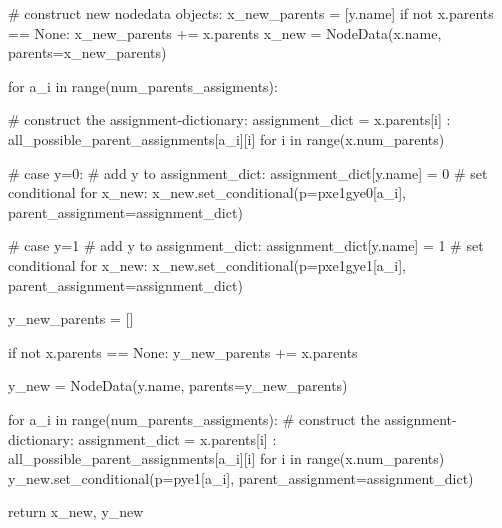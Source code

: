 \begin{python}
    # construct new nodedata objects:
    x_new_parents = [y.name]
    if not x.parents == None:
        x_new_parents += x.parents
    x_new = NodeData(x.name, parents=x_new_parents)

    for a_i in range(num_parents_assigments):
        
        # construct the assignment-dictionary:
        assignment_dict = {x.parents[i] : all_possible_parent_assignments[a_i][i] for i in range(x.num_parents)}

        # case y=0:
        # add y to assignment_dict:
        assignment_dict[y.name] = 0
        # set conditional for x_new:
        x_new.set_conditional(p=pxe1gye0[a_i], parent_assignment=assignment_dict)

        # case y=1
        # add y to assignment_dict:
        assignment_dict[y.name] = 1
        # set conditional for x_new:
        x_new.set_conditional(p=pxe1gye1[a_i], parent_assignment=assignment_dict)

    y_new_parents = []
    
    if not x.parents == None:
        y_new_parents += x.parents
        
    y_new = NodeData(y.name, parents=y_new_parents)
    
    for a_i in range(num_parents_assigments):
        # construct the assignment-dictionary:
        assignment_dict = {x.parents[i] : all_possible_parent_assignments[a_i][i] for i in range(x.num_parents)}
        y_new.set_conditional(p=pye1[a_i], parent_assignment=assignment_dict)

    return x_new, y_new
\end{python}